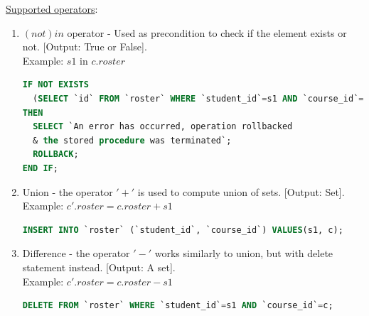 \documentclass[oneside]{book}
\begin{document}
\noindent\underline{Supported operators}:

\begin{enumerate}
\item $(not) in$ operator - Used as precondition to check if the element exists or not. [Output: True or False]. \\
Example: $s1$ in $c.roster$

\begin{lstlisting}[escapechar=@,language=SQL]
IF NOT EXISTS 
  (SELECT `id` FROM `roster` WHERE `student_id`=s1 AND `course_id`=c) 
THEN
  SELECT `An error has occurred, operation rollbacked 
  & the stored procedure was terminated`;
  ROLLBACK;
END IF;
\end{lstlisting}

\item Union - the operator $'+'$ is used to compute union of sets. [Output: Set].\\
Example: $c'.roster = c.roster + s1$

\begin{lstlisting}[escapechar=@,language=SQL]
INSERT INTO `roster` (`student_id`, `course_id`) VALUES(s1, c);
\end{lstlisting}

\item Difference - the operator $'-'$ works similarly to union, but with delete statement instead. [Output: A set].\\
Example: $c'.roster = c.roster - s1$

\begin{lstlisting}[escapechar=@,language=SQL]
DELETE FROM `roster` WHERE `student_id`=s1 AND `course_id`=c;
\end{lstlisting}


\end{enumerate}
\end{document}
